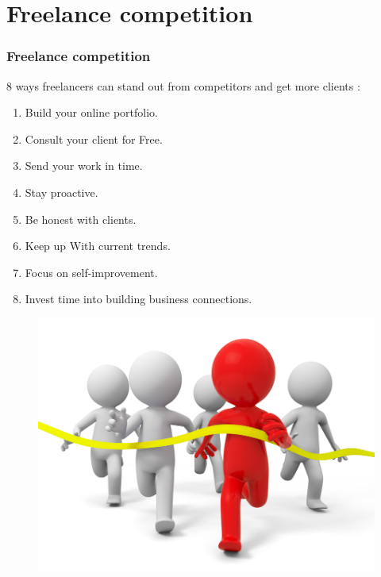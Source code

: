 \section[Freelance competition]{Freelance competition}

\begin{frame}
	\frametitle{Freelance competition}
	8 ways freelancers can stand out from competitors and get more clients :\\
	\vspace{1cm}
	\begin{minipage}{0.8\linewidth}
	    \vspace{0.5cm}
	    \fontsize{10}{12}\selectfont
	    \begin{enumerate} \itemsep0em
	        \item Build your online portfolio.
	        \item Consult your client for Free.
	        \item Send your work in time.
	        \item Stay proactive.
	        \item Be honest with clients.
	        \item Keep up With current trends.
	        \item Focus on self-improvement.
	        \item Invest time into building business connections.
	 \end{enumerate}
	 \end{minipage}
    \hspace*{-3cm}
	\begin{minipage}{0.2\linewidth}
	    \begin{figure}
            \includegraphics[scale=0.5]{figures/competition.png}
		\end{figure}
	 \end{minipage}
\end{frame}